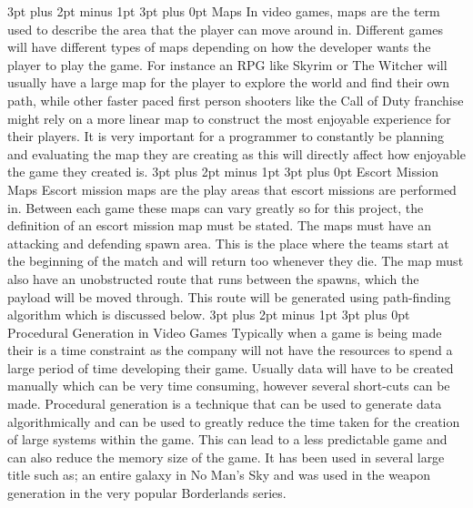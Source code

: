 \documentclass[12pt,a4paper,oneside]{book}
\makeatletter
\renewcommand\subsection{\@startsection {subsection}{1}{2mm} %
                               {3pt plus 2pt minus 1pt} %
                               {3pt plus 0pt} %
                               {\normalfont\bfseries}}
\makeatother
\begin{document}
\subsection{Maps}
In video games, maps are the term used to describe the area that the player can move around in. Different games will have different types of maps depending on how the developer wants the player to play the game. For instance an RPG like Skyrim or The Witcher will usually have a large map for the player to explore the world and find their own path, while other faster paced first person shooters like the Call of Duty franchise might rely on a more linear map to construct the most enjoyable experience for their players. It is very important for a programmer to constantly be planning and evaluating the map they are creating as this will directly affect how enjoyable the game they created is.
\vspace{5mm} 
\newline
\subsection{Escort Mission Maps}
Escort mission maps are the play areas that escort missions are performed in. Between each game these maps can vary greatly so for this project, the definition of an escort mission map must be stated. The maps must have an attacking and defending spawn area. This is the place where the teams start at the beginning of the match and will return too whenever they die. The map must also have an unobstructed route that runs between the spawns, which the payload will be moved through. This route will be generated using path-finding algorithm which is discussed below.
\vspace{5mm} 
\newline 
\subsection{Procedural Generation in Video Games}
Typically when a game is being made their is a time constraint as the company will not have the resources to spend a large period of time developing their game. Usually data will have to be created manually which can be very time consuming, however several short-cuts can be made.
\vspace{5mm} 
\newline
Procedural generation is a technique that can be used  to generate data algorithmically and can be used to greatly reduce the time taken for the creation of large systems within the game. This can lead to a less predictable game and can also reduce the memory size of the game. It has been used in several large title such as; an entire galaxy in No Man's Sky and was used in the weapon generation in the very popular Borderlands series.  
\end{document}

